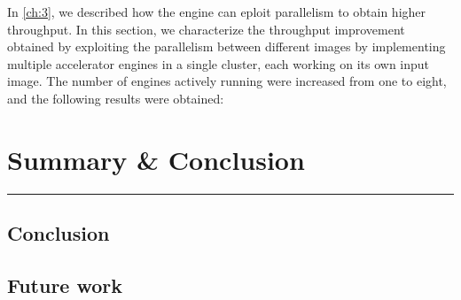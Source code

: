 \documentclass[12pt]{report}
\begin{document}
In \ref{ch:3}, we described how the engine can eploit parallelism to obtain higher throughput. In this section, we characterize the throughput improvement obtained by exploiting the parallelism between different images by implementing multiple accelerator engines in a single cluster, each working on its own input image. The number of engines actively running were increased from one to eight, and the following results were obtained:
\\

\newpage
\chapter{Summary \& Conclusion} \label{5}
\rule[10pt]{\linewidth}{3pt}
\section{Conclusion}
\section{Future work}



%
%
\clearpage
{}
\begin{thebibliography}{99}


\end{thebibliography}
\end{document}
